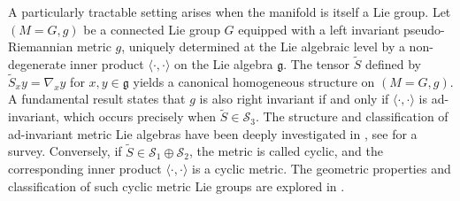 \documentclass[reqno]{amsart}
\theoremstyle{definition}
\begin{document}
A particularly tractable setting arises when the manifold is itself a Lie group.
Let $(M=G,g)$ be a connected Lie group $G$ equipped  with a left invariant pseudo-Riemannian metric $g$, uniquely determined at the Lie algebraic level by  a non-degenerate inner product $\langle\cdot,\cdot\rangle$ on the Lie algebra $\mathfrak{g}$.
The  tensor $\widetilde{S}$ defined by $\widetilde{S}_{x}y=\nabla_{x}y$ for $x,y\in \mathfrak{g}$ yields a canonical homogeneous structure on  $(M=G,g)$.
A fundamental result states that $g$ is also right invariant if and only if
$\langle\cdot,\cdot\rangle$ is ad-invariant,  which occurs precisely when $\widetilde{S}\in \mathcal{S}_{3}$.
The structure and classification of ad-invariant metric Lie algebras have been deeply investigated in \cite{fs87,mr85}, see \cite{ovando16} for a survey.
 Conversely, if  $\widetilde{S}\in \mathcal{S}_{1}\oplus \mathcal{S}_{2}$, the metric is called cyclic, and the corresponding inner product $\langle\cdot,\cdot\rangle$ is a cyclic metric.
The geometric properties and classification of such cyclic metric Lie groups are explored in \cite{abol25,cl16,ggo15,tz21}.
\end{document}
